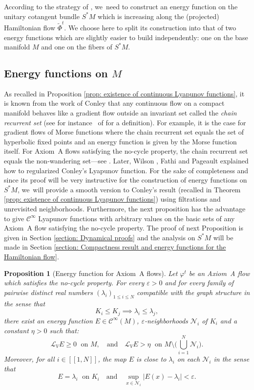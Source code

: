 \documentclass[JEP,XML,SOM,Unicode,NoEqCountersInSection,NoFloatCountersInSection,published]{cedram}
\newcommand{\lcr}{[\![}
\newcommand{\rcr}{]\!]}
\theoremstyle{definition}
\theoremstyle{plain}
\newtheorem{prop}[definition]{Proposition}
\newcommand{\Ccal}{\mathcal{C}}
\newcommand{\Lie}{\mathcal{L}}
\newcommand{\Ncal}{\mathcal{N}}
\begin{document}
According to the strategy of \cite{FS}, we~need to construct an energy function on the unitary cotangent bundle $S^*M$ which is increasing along the (projected) Hamiltonian flow $\widetilde{\Phi}^t$. We choose here to split its construction into that of two energy functions which are slightly easier to build independently: one on the base manifold $M$ and one on the fibers of $S^* M$.

\subsection{Energy functions on $M$}

As recalled in Proposition \ref{prop: existence of continuous Lyapunov functions}, it is known from the work of Conley \cite{conley} that any continuous flow on a compact manifold behaves like a gradient flow outside an invariant set called the \textit{chain recurrent set} (see for instance~\cite{palis-demelo} of \cite{FH} for a definition). For example, it is the case for gradient flows of Morse functions where the chain recurrent set equals the set of hyperbolic fixed points and an energy function is given by the Morse function itself. For Axiom~A flows satisfying the no-cycle property, the chain recurrent set equals the non-wandering set---see \cite[Th.\,5.3.47]{FH}. Later, Wilson \cite{wilson}, Fathi and Pageault \cite{fathi-pageault} explained how to regularized Conley's Lyapunov function. For the sake of completeness and since its proof will be very instructive for the construction of energy functions on $S^* M$, we~will provide a smooth version to Conley's result (recalled in Theorem \ref{prop: existence of continuous Lyapunov functions}) using filtrations and unrevisited neighborhoods. Furthermore, the next proposition has the advantage to give $\Ccal^{\infty}$ Lyapunov functions with arbitrary values on the basic sets of any Axiom~A flow satisfying the no-cycle property. The proof of next Proposition is given in Section \ref{section: Dynamical proofs} and the analysis on $S^*M$ will be made in Section \ref{section: Compactness result and energy functions for the Hamiltonian flow}.

\begin{prop}[Energy function for Axiom~A flows]\label{prop energy function for Axiom A flows}
Let $\varphi^t$ be an Axiom~A flow which satisfies the no-cycle property. For every $\varepsilon > 0$ and for every family of pairwise distinct real numbers $(\lambda_i)_{1\leq i \leq N}$ compatible with the graph structure in the sense that
\[
K_i \leq K_j \implies \lambda_i \leq \lambda_j,
\]
there exist an energy function $E \in \Ccal^{\infty}(M)$, $\varepsilon$-neighborhoods $ \Ncal_i$ of $K_i$ and a constant $\eta > 0$ such that:
\[
\Lie_V E \geq 0\;\text{ on } M, \quad \text{and}\quad \Lie_V E > \eta \;\text{ on } M \setminus \biggl(\bigcup_{i = 1}^N \Ncal_i \biggr).
\]
Moreover, for all $i\in\lcr1,N\rcr$, the map $E$ is close to $\lambda_i$ on each $\Ncal_i$ in the sense that
\[
E = \lambda_i \;\text{ on } K_i \quad\text{and}\quad \sup_{x \in \Ncal_i} |E(x) - \lambda_i | < \varepsilon.
\]
\end{prop}
\end{document}
